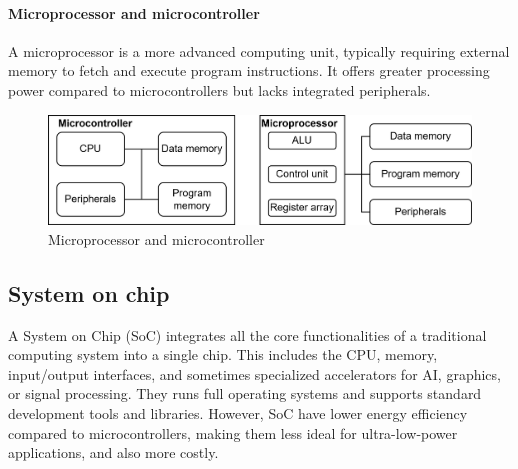 \paragraph*{Microprocessor and microcontroller} 
A microprocessor is a more advanced computing unit, typically requiring external memory to fetch and execute program instructions. 
It offers greater processing power compared to microcontrollers but lacks integrated peripherals.
\begin{figure}[H]
    \centering
    \includegraphics[width=0.75\linewidth]{images/eeai5.png}
    \caption{Microprocessor and microcontroller}
\end{figure}

\subsection{System on chip}
A System on Chip (SoC) integrates all the core functionalities of a traditional computing system into a single chip.
This includes the CPU, memory, input/output interfaces, and sometimes specialized accelerators for AI, graphics, or signal processing.
They runs full operating systems and supports standard development tools and libraries. 
However, SoC have lower energy efficiency compared to microcontrollers, making them less ideal for ultra-low-power applications, and also more costly.

